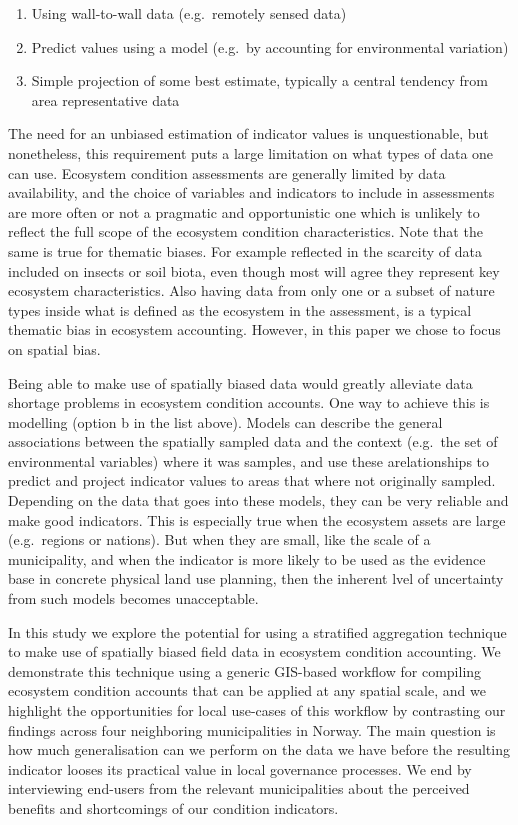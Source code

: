 \documentclass[
  super,
  preprint,
  3p]{elsarticle}
\providecommand{\tightlist}{%
  \setlength{\itemsep}{0pt}\setlength{\parskip}{0pt}}\usepackage{longtable,booktabs,array}
\begin{document}
\begin{enumerate}
\def\labelenumi{\alph{enumi}.}
\tightlist
\item
  Using wall-to-wall data (e.g.~remotely sensed data)
\item
  Predict values using a model (e.g.~by accounting for environmental
  variation)
\item
  Simple projection of some best estimate, typically a central tendency
  from area representative data
\end{enumerate}

The need for an unbiased estimation of indicator values is
unquestionable, but nonetheless, this requirement puts a large
limitation on what types of data one can use. Ecosystem condition
assessments are generally limited by data availability, and the choice
of variables and indicators to include in assessments are more often or
not a pragmatic and opportunistic one which is unlikely to reflect the
full scope of the ecosystem condition characteristics. Note that the
same is true for thematic biases. For example reflected in the scarcity
of data included on insects or soil biota, even though most will agree
they represent key ecosystem characteristics. Also having data from only
one or a subset of nature types inside what is defined as the ecosystem
in the assessment, is a typical thematic bias in ecosystem accounting.
However, in this paper we chose to focus on spatial bias.

Being able to make use of spatially biased data would greatly alleviate
data shortage problems in ecosystem condition accounts. One way to
achieve this is modelling (option b in the list above). Models can
describe the general associations between the spatially sampled data and
the context (e.g.~the set of environmental variables) where it was
samples, and use these arelationships to predict and project indicator
values to areas that where not originally sampled. Depending on the data
that goes into these models, they can be very reliable and make good
indicators. This is especially true when the ecosystem assets are large
(e.g.~regions or nations). But when they are small, like the scale of a
municipality, and when the indicator is more likely to be used as the
evidence base in concrete physical land use planning, then the inherent
lvel of uncertainty from such models becomes unacceptable.

In this study we explore the potential for using a stratified
aggregation technique to make use of spatially biased field data in
ecosystem condition accounting. We demonstrate this technique using a
generic GIS-based workflow for compiling ecosystem condition accounts
that can be applied at any spatial scale, and we highlight the
opportunities for local use-cases of this workflow by contrasting our
findings across four neighboring municipalities in Norway. The main
question is how much generalisation can we perform on the data we have
before the resulting indicator looses its practical value in local
governance processes. We end by interviewing end-users from the relevant
municipalities about the perceived benefits and shortcomings of our
condition indicators.
\end{document}
